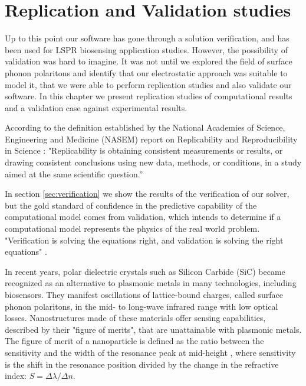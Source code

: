 
\chapter{Replication and Validation studies}

Up to this point our software \pygbe has gone through a solution verification, and has been used for 
LSPR biosensing application studies. However, the possibility of validation was hard to imagine. It was not
until we explored the field of surface phonon polaritons and identify that our electrostatic approach was suitable to model it, 
that we were able to perform replication studies and also validate our software. In this chapter we present replication 
studies of computational results and a validation case against experimental results. 

According to the definition established by the National Academies of Science, Engineering 
and Medicine (NASEM) report on Replicability and Reproducibility in Science \cite{NASEM2019}: "Replicability is obtaining 
consistent measurements or results, or drawing consistent conclusions using new data, methods, or conditions, in a
study aimed at the same scientific question.” 

In section \ref{sec:verification} we show the results of the verification of our 
solver, but the gold standard of confidence in the predictive capability of the computational model comes from validation, which 
intends to determine if a computational model represents the physics of the real world problem. "Verification is solving the equations
right, and validation is solving the right equations" \cite{Roache1998}. 

In recent years, polar dielectric crystals such as Silicon Carbide (SiC) became recognized as an alternative to 
plasmonic metals in many technologies, including biosensors. They manifest oscillations of lattice-bound charges, called surface 
phonon polaritons, in the mid- to long-wave infrared range with low optical losses. Nanostructures made of these materials offer sensing 
capabilities, described by their "figure of merits", that are unattainable with plasmonic metals. The figure of merit of a nanoparticle
is defined as the ratio between the sensitivity and the width of the resonance peak at mid-height \cite{otte2012}, where 
sensitivity is the shift in the resonance position divided by the change in the refractive index: 
$S = \Delta \lambda / \Delta n$. 

